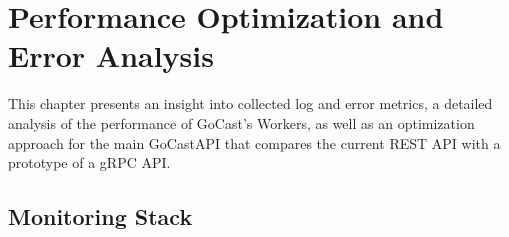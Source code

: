 
\chapter{Performance Optimization and Error Analysis}\label{chapter:optimization_and_alternative_technologies}

This chapter presents an insight into collected log and error metrics, a detailed analysis of the performance of GoCast's Workers, as well as an optimization approach for the main GoCast\ac{API} that compares the current \ac{REST} \ac{API} with a prototype of a \ac{gRPC} \ac{API}.   

\section{Monitoring Stack}

